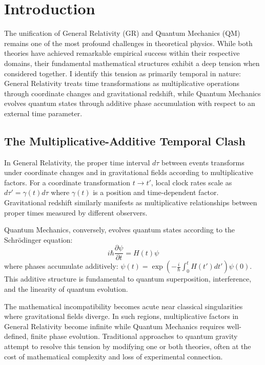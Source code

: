 \section{Introduction}
\label{sec:introduction}

The unification of General Relativity (GR) and Quantum Mechanics (QM) remains one of the most profound challenges in theoretical physics. While both theories have achieved remarkable empirical success within their respective domains, their fundamental mathematical structures exhibit a deep tension when considered together. I identify this tension as primarily temporal in nature: General Relativity treats time transformations as multiplicative operations through coordinate changes and gravitational redshift, while Quantum Mechanics evolves quantum states through additive phase accumulation with respect to an external time parameter.

\subsection{The Multiplicative-Additive Temporal Clash}

In General Relativity, the proper time interval $d\tau$ between events transforms under coordinate changes and in gravitational fields according to multiplicative factors. For a coordinate transformation $t \to t'$, local clock rates scale as $d\tau' = \gamma(t) d\tau$ where $\gamma(t)$ is a position and time-dependent factor. Gravitational redshift similarly manifests as multiplicative relationships between proper times measured by different observers.

Quantum Mechanics, conversely, evolves quantum states according to the Schrödinger equation:
\begin{equation}
i\hbar \frac{\partial \psi}{\partial t} = H(t) \psi
\end{equation}
where phases accumulate additively: $\psi(t) = \exp\left(-\frac{i}{\hbar}\int_0^t H(t') dt'\right) \psi(0)$. This additive structure is fundamental to quantum superposition, interference, and the linearity of quantum evolution.

The mathematical incompatibility becomes acute near classical singularities where gravitational fields diverge. In such regions, multiplicative factors in General Relativity become infinite while Quantum Mechanics requires well-defined, finite phase evolution. Traditional approaches to quantum gravity attempt to resolve this tension by modifying one or both theories, often at the cost of mathematical complexity and loss of experimental connection.

